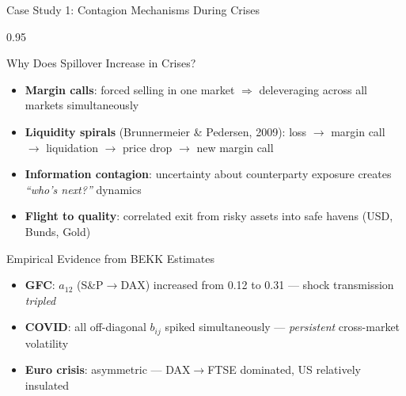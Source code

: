 \documentclass[9pt, aspectratio=169, t]{beamer}
\begin{document}
\begin{frame}{Case Study 1: Contagion Mechanisms During Crises}
    \begin{cminipage}{0.95\textwidth}
    {\footnotesize
    \begin{block}{Why Does Spillover Increase in Crises?}
        \begin{itemize}\setlength{\itemsep}{1pt}
            \item \textbf{Margin calls}: forced selling in one market $\Rightarrow$ deleveraging across all markets simultaneously
            \item \textbf{Liquidity spirals} (Brunnermeier \& Pedersen, 2009): loss $\rightarrow$ margin call $\rightarrow$ liquidation $\rightarrow$ price drop $\rightarrow$ new margin call
            \item \textbf{Information contagion}: uncertainty about counterparty exposure creates \textit{``who's next?''} dynamics
            \item \textbf{Flight to quality}: correlated exit from risky assets into safe havens (USD, Bunds, Gold)
        \end{itemize}
    \end{block}
    \begin{alertblock}{Empirical Evidence from BEKK Estimates}
        \begin{itemize}\setlength{\itemsep}{0pt}
            \item \textbf{GFC}: $a_{12}$ (S\&P$\rightarrow$DAX) increased from 0.12 to 0.31 --- shock transmission \textit{tripled}
            \item \textbf{COVID}: all off-diagonal $b_{ij}$ spiked simultaneously --- \textit{persistent} cross-market volatility
            \item \textbf{Euro crisis}: asymmetric --- DAX$\rightarrow$FTSE dominated, US relatively insulated
        \end{itemize}
    \end{alertblock}
    }
    \end{cminipage}
\end{frame}
\end{document}
